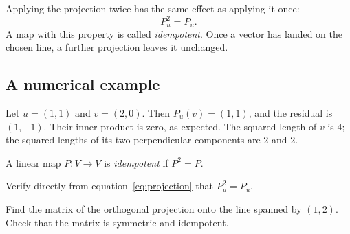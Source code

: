 \documentclass{hubbardbook}
\begin{document}
\begin{fullwidth}
\begin{center}
\end{center}
\captionsetup{hypcap=false}
\label{fig:projection}
\end{fullwidth}

\medskip
Applying the projection twice has the same effect as applying it once:
\begin{equation}\label{eq:idempotent}
  P_u^2=P_u.
\end{equation}
A map with this property is called \emph{idempotent}. Once a vector has
landed on the chosen line, a further projection leaves it unchanged.

\subsection{A numerical example}
Let \(u=(1,1)\) and \(v=(2,0)\). Then \(P_u(v)=(1,1)\), and the
residual is \((1,-1)\). Their inner product is zero, as expected.
The squared length of \(v\) is \(4\); the squared lengths of its
two perpendicular components are \(2\) and \(2\).

\begin{boxeddefinition}
A linear map \(P\colon V\to V\) is \emph{idempotent} if \(P^2=P\).
\end{boxeddefinition}

\begin{exercises}
\begin{exercise}
Verify directly from equation~\ref{eq:projection} that \(P_u^2=P_u\).
\end{exercise}
\begin{exercise}
Find the matrix of the orthogonal projection onto the line spanned by
\((1,2)\). Check that the matrix is symmetric and idempotent.
\end{exercise}
\end{exercises}
\end{document}
